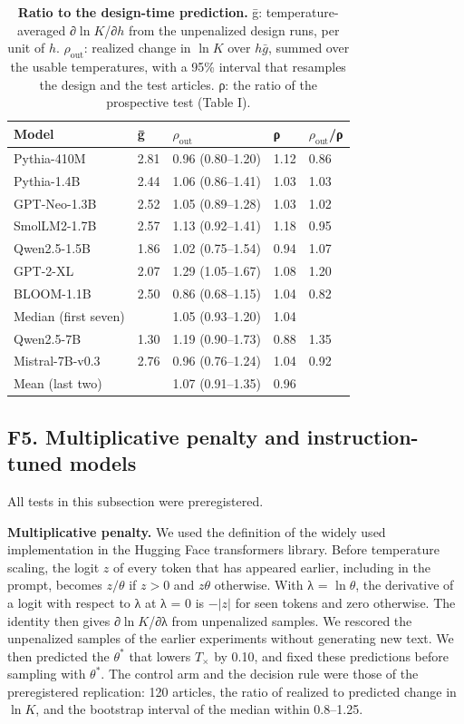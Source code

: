 \documentclass[aps,prx,onecolumn,superscriptaddress,longbibliography]{revtex4-2}
\begin{document}
\begin{table}[htbp]
\centering
\small
\setlength{\tabcolsep}{6pt}
\renewcommand{\thetable}{F5}
\caption{\textbf{Ratio to the design-time prediction.} ḡ: temperature-averaged ∂\(\ln K\)/∂\(h\) from the unpenalized design runs, per unit of \(h\). \(\rho_{\mathrm{out}}\): realized change in \(\ln K\) over \(h\bar{g}\), summed over the usable temperatures, with a 95\% interval that resamples the design and the test articles. ρ: the ratio of the prospective test (Table I).}
\label{tabF5}
\begin{tabular}{@{}lllll@{}}
\toprule
Model & ḡ & \(\rho_{\mathrm{out}}\) & ρ & \(\rho_{\mathrm{out}}\)/ρ \\
\midrule
Pythia-410M & 2.81 & 0.96 (0.80--1.20) & 1.12 & 0.86 \\
Pythia-1.4B & 2.44 & 1.06 (0.86--1.41) & 1.03 & 1.03 \\
GPT-Neo-1.3B & 2.52 & 1.05 (0.89--1.28) & 1.03 & 1.02 \\
SmolLM2-1.7B & 2.57 & 1.13 (0.92--1.41) & 1.18 & 0.95 \\
Qwen2.5-1.5B & 1.86 & 1.02 (0.75--1.54) & 0.94 & 1.07 \\
GPT-2-XL & 2.07 & 1.29 (1.05--1.67) & 1.08 & 1.20 \\
BLOOM-1.1B & 2.50 & 0.86 (0.68--1.15) & 1.04 & 0.82 \\
Median (first seven) & & 1.05 (0.93--1.20) & 1.04 & \\
Qwen2.5-7B & 1.30 & 1.19 (0.90--1.73) & 0.88 & 1.35 \\
Mistral-7B-v0.3 & 2.76 & 0.96 (0.76--1.24) & 1.04 & 0.92 \\
Mean (last two) & & 1.07 (0.91--1.35) & 0.96 & \\
\bottomrule
\end{tabular}
\end{table}


\subsection*{F5. Multiplicative penalty and instruction-tuned models}

All tests in this subsection were preregistered.

\textbf{Multiplicative penalty.} We used the definition of the widely used implementation in the Hugging Face transformers library. Before temperature scaling, the logit \(z\) of every token that has appeared earlier, including in the prompt, becomes \(z/\theta\) if \(z>0\) and \(z\theta\) otherwise. With λ = \(\ln \theta\), the derivative of a logit with respect to λ at λ = 0 is \(-|z|\) for seen tokens and zero otherwise. The identity then gives ∂\(\ln K\)/∂λ from unpenalized samples. We rescored the unpenalized samples of the earlier experiments without generating new text. We then predicted the \(\theta^*\) that lowers \(T_{\times}\) by 0.10, and fixed these predictions before sampling with \(\theta^*\). The control arm and the decision rule were those of the preregistered replication: 120 articles, the ratio of realized to predicted change in \(\ln K\), and the bootstrap interval of the median within 0.8--1.25.
\end{document}
